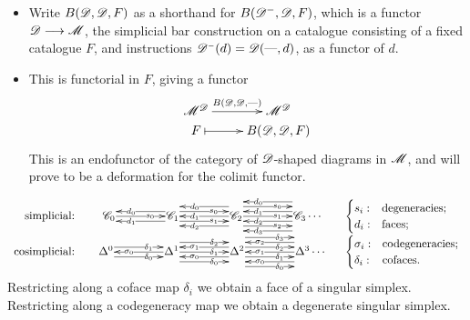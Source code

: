 \documentclass[11pt]{article}
\newcommand{\Dminus}{\scrD^\textup{\tiny$-$}}
\begin{document}
\begin{5. The unreasonably effective (co)bar construction}
\begin{itemise}
\begin{itemize}
\[{\ar[r]^-{\Dminus}%
\scrD&%
\sSet^{\scrD^{\op}}\\%
d%
\ar@{|->}[r]&
\scrD(\DASH ,d)%
}\]
\item Write $B(\mathscr{D},\mathscr{D},F)$ as a shorthand for $B(\mathscr{D}^-,\mathscr{D},F)$, which is a functor $\mathscr{D}\longrightarrow\mathscr{M}$, the simplicial bar construction on a catalogue consisting of a fixed catalogue $F$, and instructions $\Dminus(d)=\scrD(\DASH ,d)$, as a functor of $d$.
\item This is functorial in $F$, giving a functor
\[\xymatrix@R=0mm{
\ar[r]^-{B(\scrD,\scrD,\DASH )}%
\scrM^\scrD&%
\scrM^\scrD\\%
F%
\ar@{|->}[r]&
B(\scrD,\scrD,F)%
}\]
This is an endofunctor of the category of $\mathscr{D}$-shaped diagrams in $\mathscr{M}$, and will prove to be a deformation for the colimit functor.
\end{itemize}
\end{itemise}

\end{5. The unreasonably effective (co)bar construction}
\[\begin{array}{rcl}
\textup{simplicial:}\quad &
\vcenter{
\def\labelstyle{\scriptstyle}
\xymatrix@C=1.5cm@1{
\scrC_0
\ar[r]|(.65){s_0}
&
\scrC_1
\ar@<-1ex>[l]|(.65){d_0}
\ar@<+1ex>[l]|(.65){d_1}
\ar@<+1ex>[r]|(.65){s_0}
\ar@<-1ex>[r]|(.65){s_1}
&
\scrC_2
\ar[l]|(.65){d_1}
\ar@<-2ex>[l]|(.65){d_0}
\ar@<+2ex>[l]|(.65){d_2}
\ar[r]|(.65){s_1}
\ar@<+2ex>[r]|(.65){s_0}
\ar@<-2ex>[r]|(.65){s_2}
&
\scrC_3\makebox[0cm][l]{\,$\cdots $}
\ar@<-3ex>[l]|(.65){d_0}
\ar@<-1ex>[l]|(.65){d_1}
\ar@<+1ex>[l]|(.65){d_2}
\ar@<+3ex>[l]|(.65){d_3}
}}
\qquad &
\begin{cases}
s_i:&\textup{degeneracies};\\
d_i:&\textup{faces};
\end{cases}
\\
\textup{cosimplicial:}\quad &
\vcenter{
\def\labelstyle{\scriptstyle}
\xymatrix@C=1.5cm@1{
\Delta^0
\ar[r];[]|(.65){\sigma_0}
&
\Delta^1
\ar@<-1ex>[l];[]|(.65){\delta_0}
\ar@<+1ex>[l];[]|(.65){\delta_1}
\ar@<+1ex>[r];[]|(.65){\sigma_0}
\ar@<-1ex>[r];[]|(.65){\sigma_1}
&
\Delta^2
\ar[l];[]|(.65){\delta_1}
\ar@<-2ex>[l];[]|(.65){\delta_0}
\ar@<+2ex>[l];[]|(.65){\delta_2}
\ar[r];[]|(.65){\sigma_1}
\ar@<+2ex>[r];[]|(.65){\sigma_0}
\ar@<-2ex>[r];[]|(.65){\sigma_2}
&
\Delta^3\makebox[0cm][l]{\,$\cdots $}
\ar@<-3ex>[l];[]|(.65){\delta_0}
\ar@<-1ex>[l];[]|(.65){\delta_1}
\ar@<+1ex>[l];[]|(.65){\delta_2}
\ar@<+3ex>[l];[]|(.65){\delta_3}
}}
\qquad &
\begin{cases}
\sigma_i:&\textup{codegeneracies};\\
\delta_i:&\textup{cofaces}.
\end{cases}
\end{array}\]
Restricting along a coface map $\delta_i$ we obtain a face of a singular simplex. Restricting along a codegeneracy map we obtain a degenerate singular simplex.
\end{document}
